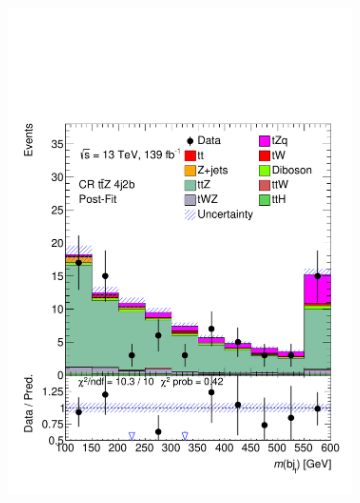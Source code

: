 \begin{figure}[!h] 
  \begin{subfigure}[b]{0.33\linewidth}
    \centering
    \includegraphics[width=\textwidth]{ubonn-thesis/Chapters/Chapters_08/appendix/data/CR_4j2b_postFit.pdf} 
    \caption{}
  \end{subfigure}%
  \begin{subfigure}[b]{0.33\linewidth}
    \centering

\end{subfigure}
\end{figure}
